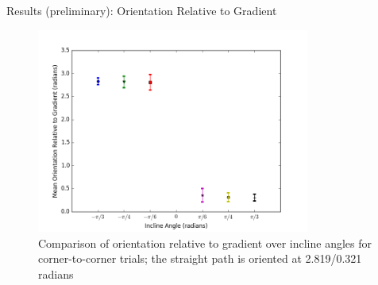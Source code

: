 \begin{frame}{Results (preliminary): Orientation Relative to Gradient}
\begin{figure}
\includegraphics[width=0.8\textwidth]{results/corner-to-cornermeanorientationrelativetogradient.png}
\caption{Comparison of orientation relative to gradient over incline angles for corner-to-corner trials; the straight path is oriented at 2.819/0.321 radians}
\end{figure}
\end{frame}